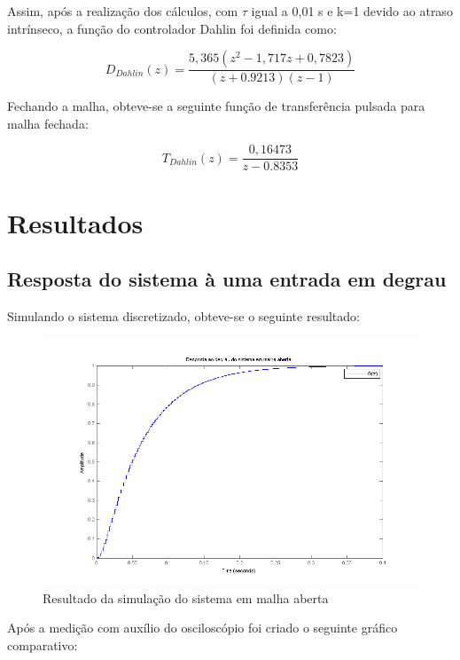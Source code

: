 \documentclass[
oneside,					%
a4paper,					%
english,					%
brazil,					%
]{abntex2}
\begin{document}
Assim, após a realização dos cálculos, com $\tau$ igual a 0,01 s e k=1 devido ao atraso intrínseco, a função do controlador Dahlin foi definida como:

\begin{equation} 
D_{Dahlin}(z) = \frac{5,365 (z^2 - 1,717z + 0,7823)}{ (z+0.9213) (z-1)}
\end{equation}

Fechando a malha, obteve-se a seguinte função de transferência pulsada para malha fechada:

\begin{equation} 
T_{Dahlin}(z) = \frac{0,16473}{z-0.8353}
\end{equation}


\chapter{Resultados}

\section{Resposta do sistema à uma entrada em degrau}

Simulando o sistema discretizado, obteve-se o seguinte resultado:

\begin{figure}[H]
	\centering
	\includegraphics[scale = 0.7]{malhaAbertaSimulacao.png}
	\caption{Resultado da simulação do sistema em malha aberta}
\end{figure}

Após a medição com auxílio do osciloscópio foi criado o seguinte gráfico comparativo:
\end{document}
